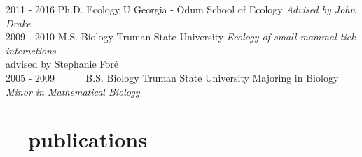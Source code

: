 \documentclass[]{CV}
\begin{document}
\begin{entrylist}
  \entry
    {2011 - 2016}
    {\normalfont Ph.D. Ecology}
    {U Georgia - Odum School of Ecology}
    {\emph{Advised by John Drake}}\\

  \entry
    {2009 - 2010}
    {M.S. Biology}
    {Truman State University}
    {\emph{Ecology of small mammal-tick interactions} \\ advised by Stephanie For\'e}\\

 \entry
    {2005 - 2009 \ \ \ \ \ }
    {B.S. Biology}
    {Truman State University}
    {Majoring in Biology\\
    \emph{Minor in Mathematical Biology}}\\
\end{entrylist}














\section{\faBook \ \  publications}

{}
\end{document}
